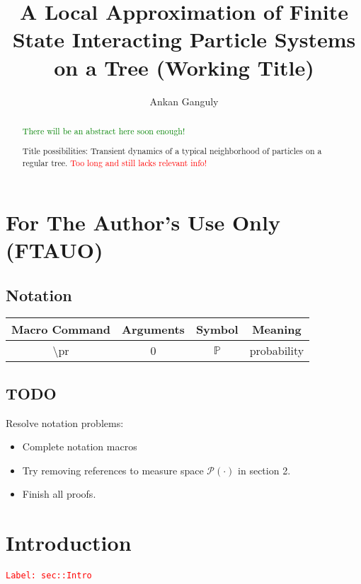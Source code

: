 \documentclass[12pt]{article}
\newcommand{\mb}{\mathbb}
\newcommand{\mc}{\mathcal}
\newcommand{\tr}{\textcolor{red}}
\newcommand{\tg}{\textcolor{green}}
\newcommand{\labe}[1]{\tr{\texttt{Label: #1}}}
\newcommand{\tbs}{\textbackslash}
\newcommand{\pr}{\mb{P}}							%
\newcommand{\pmsr}{\mc{P}}							%
\begin{document}
\title{A Local Approximation of Finite State Interacting Particle Systems on a Tree (Working Title)}
\author{Ankan Ganguly}

\maketitle

\begin{abstract}
\tg{There will be an abstract here soon enough!}

Title possibilities: Transient dynamics of a typical neighborhood of particles on a regular tree. \tr{Too long and still lacks relevant info!}
\end{abstract}

\newpage
\tableofcontents

\newpage

\section*{For The Author's Use Only (FTAUO)}
\subsection*{Notation}

\begin{longtable}{c|c|c|c}
Macro Command & Arguments & Symbol & Meaning\\\hline
\tbs pr&0&\(\pr\)	& probability\\
\end{longtable}

\subsection*{TODO}

Resolve notation problems:

\begin{itemize}
\item Complete notation macros

\item Try removing references to measure space \(\pmsr(\cdot)\) in section 2.

\item Finish all proofs.
\end{itemize}

\section{Introduction}
\label{sec::Intro}\labe{sec::Intro}
\end{document}
